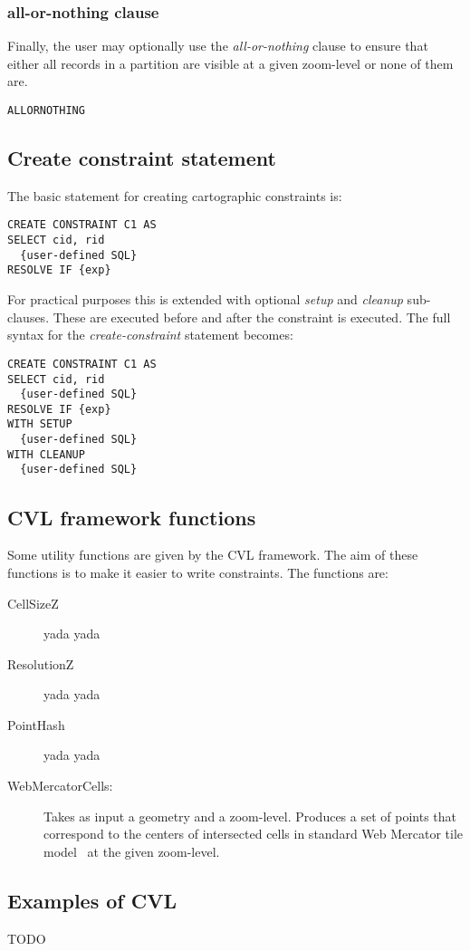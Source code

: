 \subsubsection{all-or-nothing clause}

Finally, the user may optionally use the \emph{all-or-nothing} clause to ensure that either all records in a partition are visible at a given zoom-level or none of them are.

\begin{lstlisting}
ALLORNOTHING
\end{lstlisting}

\subsection{Create constraint statement}
\label{sec:create-constraint-statement}

The basic statement for creating cartographic constraints is:

\begin{lstlisting}
CREATE CONSTRAINT C1 AS
SELECT cid, rid
  {user-defined SQL}
RESOLVE IF {exp}
\end{lstlisting}

For practical purposes this is extended with optional \emph{setup} and \emph{cleanup} sub-clauses. These are executed before and after the constraint is executed. The full syntax for the \emph{create-constraint} statement becomes:

\begin{lstlisting}
CREATE CONSTRAINT C1 AS
SELECT cid, rid
  {user-defined SQL}
RESOLVE IF {exp}
WITH SETUP
  {user-defined SQL}
WITH CLEANUP
  {user-defined SQL}
\end{lstlisting}

\subsection{CVL framework functions}

Some utility functions are given by the CVL framework. The aim of these functions is to make it easier to write constraints. The functions are:

\begin{description}
\item [CellSizeZ] yada yada
\item [ResolutionZ] yada yada
\item [PointHash] yada yada
\item [WebMercatorCells:] Takes as input a geometry and a zoom-level. Produces a set of points that correspond to the centers of intersected cells in standard Web Mercator tile model~\cite{osm?} at the given zoom-level.
\end{description}


\subsection{Examples of CVL}

TODO
